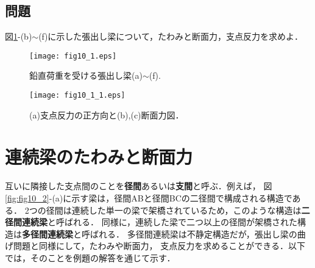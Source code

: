\documentclass[10pt,a4j]{jbook}
\begin{document}
\subsection{問題}
図\ref{fig:fig10_1}-(b)$\sim$(f)に示した張出し梁について，たわみと断面力，支点反力を求めよ．
\begin{figure}[h]
	\begin{center}
	\texttt{[image: fig10\_1.eps]} 
	\end{center}
	\caption{
	鉛直荷重を受ける張出し梁(a)$\sim$(f).
	} 
	\label{fig:fig10_1}
\end{figure}
\begin{figure}[h]
	\begin{center}
	\texttt{[image: fig10\_1\_1.eps]} 
	\end{center}
	\caption{
	(a)支点反力の正方向と(b),(c)断面力図．
	} 
	\label{fig:fig10_1_1}
\end{figure}
%
%
%
\section{連続梁のたわみと断面力}
互いに隣接した支点間のことを{\bf 径間}あるいは{\bf 支間}と呼ぶ．例えば，
図\ref{fig:fig10_2}-(a)に示す梁は，径間ABと径間BCの二径間で構成される構造である．
2つの径間は連続した単一の梁で架橋されているため，このような構造は{\bf 二径間連続梁}と呼ばれる．
同様に，連続した梁で二つ以上の径間が架橋された構造は{\bf 多径間連続梁}と呼ばれる．
多径間連続梁は不静定構造だが，張出し梁の曲げ問題と同様にして，たわみや断面力，
支点反力を求めることができる．以下では，そのことを例題の解答を通じて示す．
\end{document}

